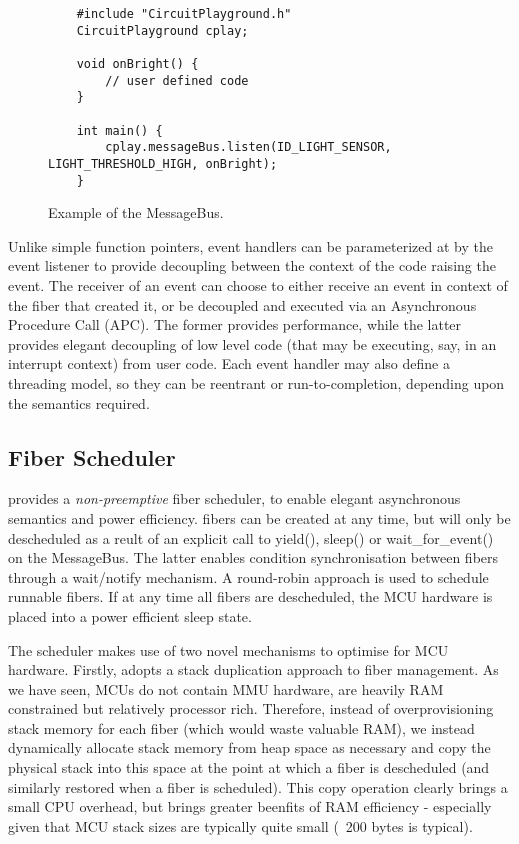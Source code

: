 \begin{figure}
    \begin{lstlisting}
    #include "CircuitPlayground.h"
    CircuitPlayground cplay;
    
    void onBright() {
        // user defined code
    }
    
    int main() {
        cplay.messageBus.listen(ID_LIGHT_SENSOR, LIGHT_THRESHOLD_HIGH, onBright);
    }
    \end{lstlisting}
    \caption{\label{fig:messageBus}Example of the \CO MessageBus.}
\end{figure}
    
Unlike simple function pointers, \CO event handlers can be parameterized at by the event listener to provide decoupling between the context of the code raising the event. The receiver of an event can choose to either receive an event in context of the fiber that created it, or be decoupled and executed via an Asynchronous Procedure Call (APC). The former provides performance, while the latter provides elegant decoupling of low level code (that may be executing, say, in an interrupt context) from user code. Each event handler may also define a threading model, so they can be reentrant or run-to-completion, depending upon the semantics required.

\subsection{Fiber Scheduler}
\CO provides a \emph{non-preemptive} fiber scheduler, to enable elegant asynchronous semantics and power efficiency. \CO fibers can be created at any time, but will only be descheduled as a reult of an explicit call to yield(), sleep() or wait\_for\_event() on the MessageBus. The latter enables condition synchronisation between fibers through a wait/notify mechanism. A round-robin approach is used to schedule runnable fibers. If at any time all fibers are descheduled, the MCU hardware is placed into a power efficient sleep state. 

The \CO scheduler makes use of two novel mechanisms to optimise for MCU hardware. Firstly, \CO adopts a stack duplication approach to fiber management. As we have seen, MCUs do not contain MMU hardware, are heavily RAM constrained but relatively processor rich. Therefore, instead of overprovisioning stack memory for each fiber (which would waste valuable RAM), we instead dynamically allocate stack memory from heap space as necessary and copy the physical stack into this space at the point at which a fiber is descheduled (and similarly restored when a fiber is scheduled). This copy operation clearly brings a small CPU overhead, but brings greater beenfits of RAM efficiency - especially given that MCU stack sizes are typically quite small (~200 bytes is typical). 

